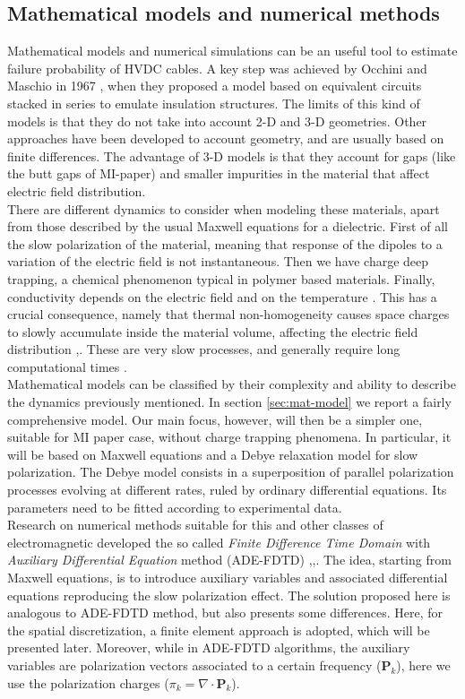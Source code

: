 \documentclass[11pt,a4paper]{article}
\begin{document}
\subsection{Mathematical models and numerical methods}\label{sec:mmnm}
Mathematical models and numerical simulations can be an useful tool to estimate failure probability of HVDC cables. A key step was achieved by Occhini and Maschio in 1967 \cite{4073280}, when they proposed a model based on equivalent circuits stacked in series to emulate insulation structures. The limits of this kind of models is that they do not take into account 2-D and 3-D geometries. Other approaches have been developed to account geometry, and are usually based on finite differences. The advantage of 3-D models is that they account for gaps (like the butt gaps of MI-paper) and smaller impurities in the material that affect electric field distribution.\\
There are different dynamics to consider when modeling these materials, apart from those described by the usual Maxwell equations for a dielectric. First of all the slow polarization of the material, meaning that response of the dipoles to a variation of the electric field is not instantaneous. Then we have charge deep trapping, a chemical phenomenon typical in polymer based materials. Finally, conductivity depends on the electric field and on the temperature \cite{time-dep-layered}. This has a crucial consequence, namely that thermal non-homogeneity causes space charges to slowly accumulate inside the material volume, affecting the electric field distribution \cite{en13195189},\cite{8939463}. These are very slow processes, and generally require long computational times \cite{https://doi.org/10.1002/jnm.2713}.\\
Mathematical models can be classified by their complexity and ability to describe the dynamics previously mentioned. In section \ref{sec:mat-model} we report a fairly comprehensive model. Our main focus, however, will then be a simpler one, suitable for MI paper case, without charge trapping phenomena. In particular, it will be based on Maxwell equations and a Debye relaxation model for slow polarization. The Debye model consists in a superposition of parallel polarization processes evolving at different rates, ruled by ordinary differential equations. Its parameters need to be fitted according to experimental data.\\
Research on numerical methods suitable for this and other classes of electromagnetic developed the so called \textit{Finite Difference Time Domain} with \textit{Auxiliary Differential Equation} method (ADE-FDTD) \cite{taflove},\cite{ADE-FDTD-thesis},\cite{ADE-FDTD-art}. The idea, starting from Maxwell equations, is to introduce auxiliary variables and associated differential equations reproducing the slow polarization effect. The solution proposed here is analogous to ADE-FDTD method, but also presents some differences. Here, for the spatial discretization, a finite element approach is adopted, which will be presented later. Moreover, while in ADE-FDTD algorithms, the auxiliary variables are polarization vectors associated to a certain frequency (\(\mathbf{P}_k\)), here we use the polarization charges (\(\pi_k=\nabla \cdot\mathbf{P}_k\)).
\end{document}
